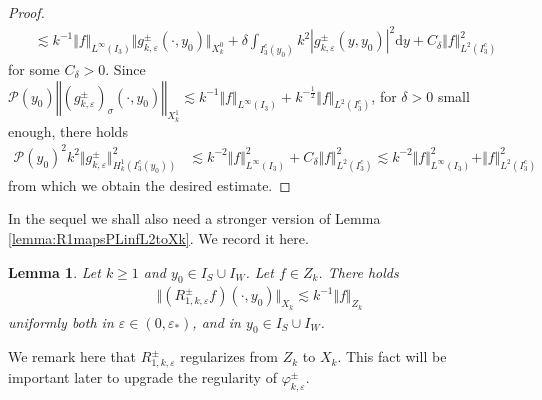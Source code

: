\documentclass[11pt,reqno]{amsproc}
\newtheorem{lemma}[proposition]{Lemma}
\theoremstyle{definition}
\numberwithin{equation}{section}
\renewcommand{\d}{\mathrm{d}}
\newcommand{\ep}{\varepsilon}
\renewcommand{\P}{{\mathcal{P}}}
\begin{document}
\begin{proof}
\begin{align*}
& \lesssim k^{-1}\Vert f \Vert_{L^\infty(I_3)}\Vert g_{k,\ep}^\pm(\cdot, y_0) \Vert_{X_k^0} + \delta \int_{I_3^c(y_0)}k^2 | g_{k,\ep}^\pm(y,y_0)|^2 \d y + C_\delta \Vert f \Vert_{L^2(I_3^c)}^2 
\end{align*}
for some $C_\delta>0$. Since $\P(y_0)\left \Vert \left( g_{k,\ep}^\pm \right)_{\sigma}(\cdot,y_0)\right\Vert_{X_k^1}\lesssim k^{-1} \Vert f \Vert_{L^\infty(I_3)} + k^{-\frac12}\Vert f \Vert_{L^2(I_3^c)} $, for $\delta>0$ small enough, there holds
\begin{align*}
\P(y_0)^2k^2\Vert g_{k,\ep}^\pm \Vert_{H^1_k(I_3^c(y_0))}^2 &\lesssim k^{-2}\Vert f \Vert_{L^\infty(I_3)}^2 + C_\delta\Vert f \Vert_{L^2(I_3^c)}^2 \lesssim k^{-2}\Vert f \Vert_{L^\infty(I_3)}^2 + \Vert f \Vert_{L^2(I_3^c)}^2
\end{align*}
from which we obtain the desired estimate. 
\end{proof}

In the sequel we shall also need a stronger version of Lemma \ref{lemma:R1mapsPLinfL2toXk}. We record it here.
\begin{lemma}\label{lemma:R1mapsXktoXk}
Let $k\geq 1$ and $y_0\in I_S\cup I_{W}$. Let $f\in Z_k$. There holds
\begin{align*}
\Vert (R_{1,k,\ep}^\pm f)(\cdot,y_0) \Vert_{X_k} \lesssim k^{-1}\Vert f \Vert_{Z_k}
\end{align*}
uniformly both in $\ep\in (0, \ep_*)$, and in $y_0\in I_S\cup I_{W}$.
\end{lemma}

We remark here that $R_{1,k,\ep}^\pm$ regularizes from $Z_k$ to $X_k$. This fact will be important later to upgrade the regularity of $\varphi_{k,\ep}^\pm$.
\end{document}
